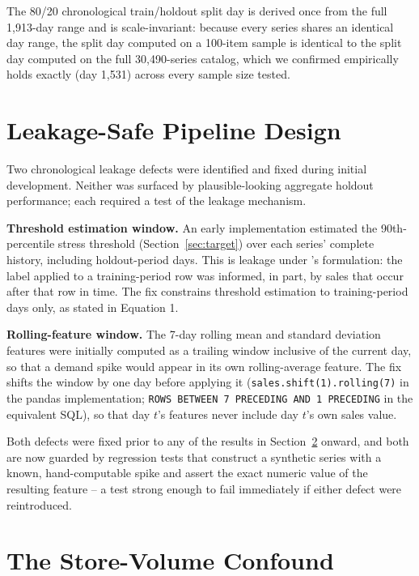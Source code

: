 \documentclass[11pt]{article}
\begin{document}
The 80/20 chronological train/holdout split day is derived once from the full 1{,}913-day range and is scale-invariant: because every series shares an identical day range, the split day computed on a 100-item sample is identical to the split day computed on the full 30{,}490-series catalog, which we confirmed empirically holds exactly (day 1{,}531) across every sample size tested.

\section{Leakage-Safe Pipeline Design}
\label{sec:leakage}

Two chronological leakage defects were identified and fixed during initial development. Neither was surfaced by plausible-looking aggregate holdout performance; each required a test of the leakage mechanism.

\textbf{Threshold estimation window.} An early implementation estimated the 90th-percentile stress threshold (Section~\ref{sec:target}) over each series' complete history, including holdout-period days. This is leakage under \citet{kaufman2012leakage}'s formulation: the label applied to a training-period row was informed, in part, by sales that occur after that row in time. The fix constrains threshold estimation to training-period days only, as stated in Equation 1.

\textbf{Rolling-feature window.} The 7-day rolling mean and standard deviation features were initially computed as a trailing window inclusive of the current day, so that a demand spike would appear in its own rolling-average feature. The fix shifts the window by one day before applying it (\texttt{sales.shift(1).rolling(7)} in the pandas implementation; \texttt{ROWS BETWEEN 7 PRECEDING AND 1 PRECEDING} in the equivalent SQL), so that day $t$'s features never include day $t$'s own sales value.

Both defects were fixed prior to any of the results in Section~\ref{sec:confound} onward, and both are now guarded by regression tests that construct a synthetic series with a known, hand-computable spike and assert the exact numeric value of the resulting feature -- a test strong enough to fail immediately if either defect were reintroduced.

\section{The Store-Volume Confound}
\label{sec:confound}
\end{document}
